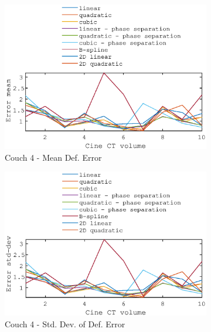 \documentclass[11pt,a4paper,oneside]{report}
\begin{document}
\begin{figure}[H]
\begin{subfigure}[b]{0.5\textwidth}
    \includegraphics[width=\textwidth, trim=0 0 0 \trimval,clip=true]{figures/task4/def_mean_error_couch4.eps}
    \caption{Couch 4 - Mean Def. Error}
  \end{subfigure}%
  \begin{subfigure}[b]{0.5\textwidth}
    \includegraphics[width=\textwidth, trim=0 0 0 \trimval,clip=true]{figures/task4/def_stddev_error_couch4.eps}
    \caption{Couch 4 - Std. Dev. of Def. Error}
  \end{subfigure}
  ~
    \hspace*{-2em}
  \begin{subfigure}[b]{0.5\textwidth}

\end{subfigure}
\end{figure}
\end{document}

